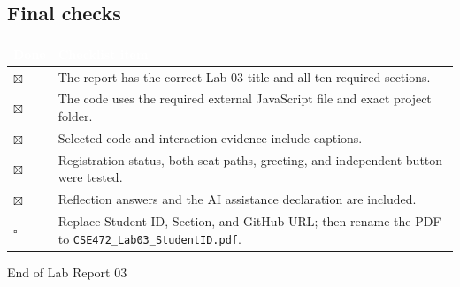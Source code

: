 \documentclass[11pt,a4paper]{article}
\begin{document}
\subsection*{Final checks}
\begin{tabularx}{\textwidth}{L{0.08\textwidth}Y}
    \toprule
    \textcolor{white}{\textbf{Done}} & \textcolor{white}{\textbf{Checklist item}} \\
    \midrule
    \textcolor{success}{$\boxtimes$} & The report has the correct Lab 03 title and all ten required sections. \\
    \textcolor{success}{$\boxtimes$} & The code uses the required external JavaScript file and exact project folder. \\
    \textcolor{success}{$\boxtimes$} & Selected code and interaction evidence include captions. \\
    \textcolor{success}{$\boxtimes$} & Registration status, both seat paths, greeting, and independent button were tested. \\
    \textcolor{success}{$\boxtimes$} & Reflection answers and the AI assistance declaration are included. \\
    \textcolor{warning}{$\square$} & Replace Student ID, Section, and GitHub URL; then rename the PDF to \texttt{CSE472\_Lab03\_StudentID.pdf}. \\
    \bottomrule
\end{tabularx}

\vfill
\begin{center}
    \color{muted}\small End of Lab Report 03
\end{center}
\end{document}
